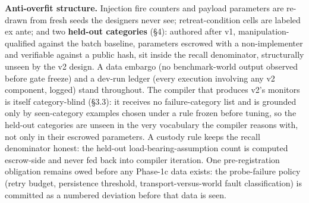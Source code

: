 \documentclass[acmsmall,screen,review,anonymous]{acmart}
\begin{document}
\textbf{Anti-overfit structure.} Injection fire counters and payload parameters are re-drawn from fresh seeds the designers never see; retreat-condition cells are labeled ex ante; and two \textbf{held-out categories} (\S4): authored after v1, manipulation-qualified against the batch baseline, parameters escrowed with a non-implementer and verifiable against a public hash, sit inside the recall denominator, structurally unseen by the v2 design. A data embargo (no benchmark-world output observed before gate freeze) and a dev-run ledger (every execution involving any v2 component, logged) stand throughout. The compiler that produces v2's monitors is itself category-blind (\S3.3): it receives no failure-category list and is grounded only by seen-category examples chosen under a rule frozen before tuning, so the held-out categories are unseen in the very vocabulary the compiler reasons with, not only in their escrowed parameters. A custody rule keeps the recall denominator honest: the held-out load-bearing-assumption count is computed escrow-side and never fed back into compiler iteration. One pre-registration obligation remains owed before any Phase-1c data exists: the probe-failure policy (retry budget, persistence threshold, transport-versus-world fault classification) is committed as a numbered deviation before that data is seen.
\end{document}
